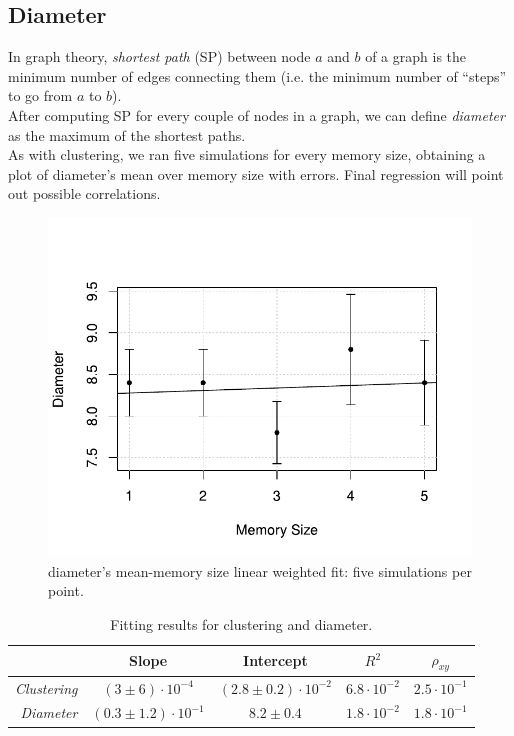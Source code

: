 \subsection{Diameter} \label{diameter}
In graph theory, \textit{shortest path} \cite{diameter} (SP) between node $a$ and $b$ of a graph is the minimum number of edges connecting them (i.e. the minimum number of ``steps'' to go from $a$ to $b$).\\
After computing SP for every couple of nodes in a graph, we can define \textit{diameter} \cite{diameter} as the maximum of the shortest paths.\\
As with clustering, we ran five  simulations for every memory size, obtaining a plot of diameter's mean over memory size with errors. Final regression will point out possible correlations.
\begin{figure}[h]
  \centering
  \includegraphics[trim={0cm 0cm 0cm 1cm},clip,width=.8\columnwidth]{img/diameter.pdf}
  \caption{diameter's mean-memory size linear weighted fit: five simulations per point.}
  \label{fig:diameter}
\end{figure}
\begin{table}[h] 
\label{tab:clustering_diameter}
\centering
\begin{tabular}{r|cccc}
\toprule
& Slope & Intercept & $R^2$ & $\rho_{xy}$ \\
\midrule
\textit{Clustering} & $(3 \pm 6) \cdot 10^{-4}$ &$(2.8 \pm 0.2) \cdot 10^{-2}$ &$6.8 \cdot 10^{-2}$ & $2.5 \cdot 10^{-1}$ \\
\textit{Diameter} & $(0.3 \pm 1.2) \cdot 10^{-1}$ & $8.2 \pm 0.4$ & $1.8 \cdot 10^{-2}$ & $1.8 \cdot 10^{-1}$  \\
\bottomrule
\end{tabular}
\caption{Fitting results for clustering and diameter.}
\end{table}

